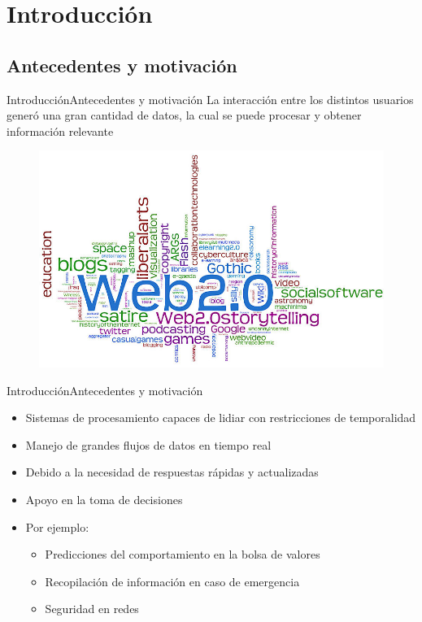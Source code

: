 \section{Introducción}
\subsection*{Antecedentes y motivación}

\begin{frame}{Introducción}{Antecedentes y motivación}
La interacción entre los distintos usuarios gener\'o una gran cantidad de datos, la cual se puede procesar y obtener información relevante
\begin{figure}
  \center
    \includegraphics[scale=0.35]{images/Web.jpg}
\end{figure}
\end{frame}

\begin{frame}{Introducción}{Antecedentes y motivación}
\begin{itemize}
\item Sistemas de procesamiento capaces de lidiar con restricciones de temporalidad
\item Manejo de grandes flujos de datos en tiempo real
\item Debido a la necesidad de respuestas rápidas y actualizadas
\item Apoyo en la toma de decisiones
\item Por ejemplo:
	\begin{itemize}
	\item Predicciones del comportamiento en la bolsa de valores
	\item Recopilación de información en caso de emergencia
	\item Seguridad en redes 
	\end{itemize}
\end{itemize}
\end{frame}

